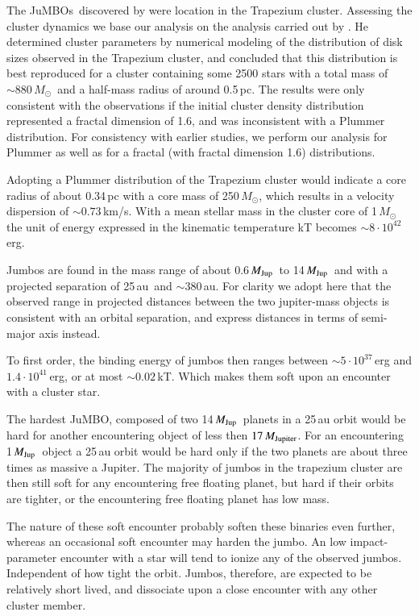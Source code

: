 \documentclass[aa]{lib/aa}
\newcommand{\MSun}{\mbox{${M}_\odot$}}
\newcommand{\MJup}{\mbox{${M}_{\rm Jup}$}}
\newcommand{\jumbo}{\mbox{JuMBO}}
\newcommand{\jumbos}{\mbox{JuMBOs}}
\begin{document}
The \jumbos\, discovered by \cite{2023arXiv231001231P} were location
in the Trapezium cluster. Assessing the cluster dynamics we base our
analysis on the analysis carried out by \cite{2016MNRAS.457..313P}.
He determined cluster parameters by numerical modeling of the
distribution of disk sizes observed in the Trapezium cluster, and
concluded that this distribution is best reproduced for a cluster
containing some 2500 stars with a total mass of $\sim 880$\,\MSun\,
and a half-mass radius of around 0.5\,pc. The results were only
consistent with the observations if the initial cluster density
distribution represented a fractal dimension of 1.6, and was
inconsistent with a Plummer \cite{1911MNRAS..71..460P} distribution.
For consistency with earlier studies, we perform our analysis for
Plummer as well as for a fractal (with fractal dimension 1.6)
distributions.

Adopting a Plummer distribution of the Trapezium cluster would
indicate a core radius of about 0.34\,pc with a core mass of
250\,\MSun, which results in a velocity dispersion of $\sim
0.73$\,km/s. With a mean stellar mass in the cluster core of
1\,\MSun\, the unit of energy expressed in the kinematic temperature
kT becomes $\sim 8 \cdot 10^{42}$\,erg.

Jumbos are found in the mass range of about 0.6\,\MJup\, to
14\,\MJup\, and with a projected separation of 25\,au\, and $\sim
380$\,au. For clarity we adopt here that the observed range in
projected distances between the two jupiter-mass objects is consistent
with an orbital separation, and express distances in terms of
semi-major axis instead.

To first order, the binding energy of jumbos then ranges between $\sim
5\cdot 10^{37}$\,erg and $1.4\cdot 10^{41}$\,erg, or at most $\sim
0.02$\,kT. Which makes them soft upon an encounter with a cluster
star.

The hardest \jumbo, composed of two 14\,\MJup\, planets in a 25\,au
orbit would be hard for another encountering object of less then
$17\,M_{\rm Jupiter}$.  For an encountering 1\,\MJup\, object a 25\,au
orbit would be hard only if the two planets are about three times as
massive a Jupiter.  The majority of jumbos in the trapezium cluster
are then still soft for any encountering free floating planet, but
hard if their orbits are tighter, or the encountering free floating
planet has low mass.

The nature of these soft encounter probably soften these binaries even
further, whereas an occasional soft encounter may harden the jumbo.
An low impact-parameter encounter with a star will tend to ionize any
of the observed jumbos.  Independent of how tight the orbit.  Jumbos,
therefore, are expected to be relatively short lived, and dissociate
upon a close encounter with any other cluster member.
\end{document}
